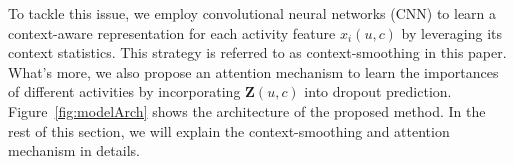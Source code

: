 To tackle this issue, we employ convolutional neural networks (CNN) to learn a context-aware representation for each activity feature $x_i(u, c)$ by leveraging its context statistics. This strategy is referred to as context-smoothing in this paper. What's more, we also propose an attention mechanism to learn the importances of different activities by incorporating $\textbf{Z}(u,c)$ into dropout prediction. Figure~\ref{fig:modelArch} shows the architecture of the proposed method.  In the rest of this section, we will explain the context-smoothing and attention mechanism in details.
 



